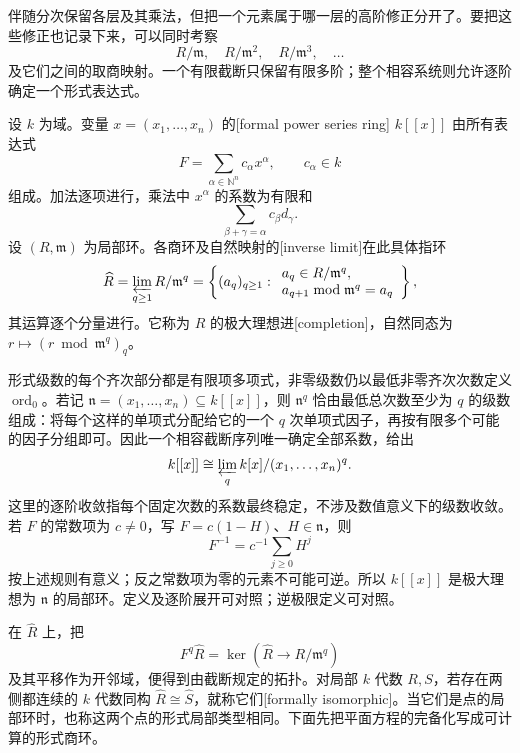 伴随分次保留各层及其乘法，但把一个元素属于哪一层的高阶修正分开了。要把这些修正也记录下来，可以同时考察
\[
	R/\mathfrak m,\quad R/\mathfrak m^2,\quad R/\mathfrak m^3,\quad\ldots
\]
及它们之间的取商映射。一个有限截断只保留有限多阶；整个相容系统则允许逐阶确定一个形式表达式。

\begin{definition}
\label{g5:def:formal-series-and-completion}
	设 \(k\) 为域。变量 \(x=(x_1,\ldots,x_n)\) 的[formal power series ring] \(k[[x]]\) 由所有表达式
	\[
		F=\sum_{\alpha\in\mathbb N^n}c_\alpha x^\alpha,\qquad c_\alpha\in k
	\]
	组成。加法逐项进行，乘法中 \(x^\alpha\) 的系数为有限和
	\[
		\sum_{\beta+\gamma=\alpha}c_\beta d_\gamma.
	\]
	设 \((R,\mathfrak m)\) 为局部环。各商环及自然映射的[inverse limit]在此具体指环
	\[
		\widehat R
		=\varprojlim_{q\geq1}R/\mathfrak m^q
		=\left\{(a_q)_{q\geq1}:
		\begin{array}{l}
			a_q\in R/\mathfrak m^q,\\
			a_{q+1}\bmod\mathfrak m^q=a_q
		\end{array}
		\right\},
	\]
	其运算逐个分量进行。它称为 \(R\) 的极大理想进[completion]，自然同态为 \(r\mapsto(r\bmod\mathfrak m^q)_q\)。
\end{definition}

形式级数的每个齐次部分都是有限项多项式，非零级数仍以最低非零齐次次数定义 \(\operatorname{ord}_0\)。若记 \(\mathfrak n=(x_1,\ldots,x_n)\subseteq k[[x]]\)，则 \(\mathfrak n^q\) 恰由最低总次数至少为 \(q\) 的级数组成：将每个这样的单项式分配给它的一个 \(q\) 次单项式因子，再按有限多个可能的因子分组即可。因此一个相容截断序列唯一确定全部系数，给出
\[
	k[[x]]\cong\varprojlim_q k[x]/(x_1,\ldots,x_n)^q.
\]
这里的逐阶收敛指每个固定次数的系数最终稳定，不涉及数值意义下的级数收敛。若 \(F\) 的常数项为 \(c\ne0\)，写 \(F=c(1-H)\)、\(H\in\mathfrak n\)，则
\[
	F^{-1}=c^{-1}\sum_{j\geq0}H^j
\]
按上述规则有意义；反之常数项为零的元素不可能可逆。所以 \(k[[x]]\) 是极大理想为 \(\mathfrak n\) 的局部环。定义及逐阶展开可对照\cite[第2章，第2.2节，定义2.4，第101页]{Shafarevich2013Basic1}；逆极限定义可对照\cite[第8节，第55页]{Matsumura1989}。

\ProseParagraphBreak

在 \(\widehat R\) 上，把
\[
	F^q\widehat R=\ker(\widehat R\longrightarrow R/\mathfrak m^q)
\]
及其平移作为开邻域，便得到由截断规定的拓扑。对局部 \(k\) 代数 \(R,S\)，若存在两侧都连续的 \(k\) 代数同构 \(\widehat R\cong\widehat S\)，就称它们[formally isomorphic]。当它们是点的局部环时，也称这两个点的形式局部类型相同。下面先把平面方程的完备化写成可计算的形式商环。


